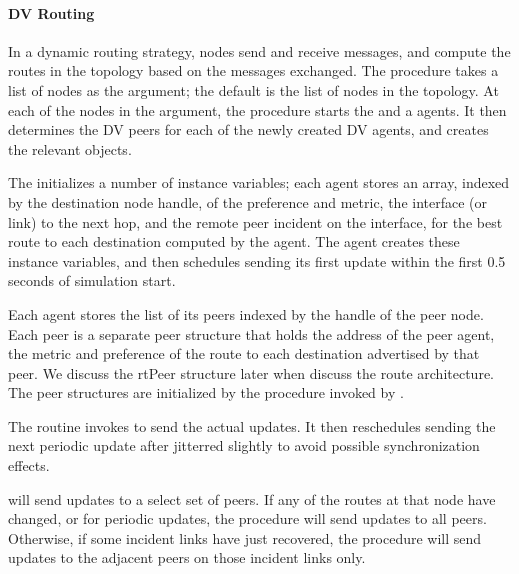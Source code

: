 \paragraph{DV Routing}
In a dynamic routing strategy, nodes send and receive messages,
and compute the routes in the topology based on the messages exchanged.
The procedure
takes a list of nodes as the argument;
the default is the list of nodes in the topology.
At each of the nodes in the argument, the procedure starts the
 and a 
 agents.
It then determines the DV peers for each of the newly created DV agents,
and creates the relevant  objects.

The
initializes a number of instance variables;
each agent stores an array, indexed by the destination node handle,
of the preference and metric, the interface (or link) to the next hop,
and the remote peer incident on the interface,
for the best route to each destination computed by the agent.
The agent creates these instance variables, and then
schedules sending its first update within the first
0.5 seconds of simulation start.

Each agent stores the list of its peers indexed by the handle
of the peer node.
Each peer is a separate peer structure that holds
the address of the peer agent, the metric and preference
of the route to each destination advertised by that peer.
We discuss the rtPeer structure later
when discuss the route architecture.
The peer structures are initialized by the procedure
invoked by .

The routine 
invokes  to send the actual updates.
It then reschedules sending the next periodic update
after  jitterred slightly to avoid
possible synchronization effects.

will send updates to a select set of peers.
If any of the routes at that node have changed, or for periodic updates,
the procedure will send updates to all peers.
Otherwise, if some incident links have just recovered,
the procedure will send updates to the adjacent peers on those incident
links only.

